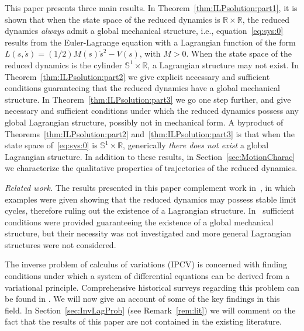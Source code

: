 This paper presents three main results. In
Theorem~\ref{thm:ILPsolution:part1}, it is shown that when the state
space of the reduced dynamics is $\mathbb{R} \times \mathbb{R}$, the reduced
dynamics {\em always} admit a global mechanical structure, i.e.,
equation~\eqref{eq:sys:0} results from the Euler-Lagrange equation
with a Lagrangian function of the form $L(s,\dot s) = (1/2) M(s) \dot
s^2 - V(s)$, with $M > 0$.  When the state space of the reduced
dynamics is the cylinder $\mathbb{S}^1 \times \mathbb{R}$, a Lagrangian structure
may not exist. In Theorem~\ref{thm:ILPsolution:part2} we give explicit
necessary and sufficient conditions guaranteeing that the reduced
dynamics have a global mechanical structure.  In
Theorem~\ref{thm:ILPsolution:part3} we go one step further, and give
necessary and sufficient conditions under which the reduced dynamics
possess any global Lagrangian structure, possibly not in mechanical
form. A byproduct of Theorems~\ref{thm:ILPsolution:part2}
and~\ref{thm:ILPsolution:part3} is that when the state space
of~\eqref{eq:sys:0} is $\mathbb{S}^1 \times \mathbb{R}$, generically {\em there does
	not exist} a global Lagrangian structure.  In addition to these
results, in Section~\ref{sec:MotionCharac} we characterize the
qualitative properties of trajectories of the reduced dynamics.

{\em Related work.}  The results presented in this paper complement
work in~\cite{Maggiore-2012,Consolini-2012}, in which examples were
given showing that the reduced dynamics may possess stable limit
cycles, therefore ruling out the existence of a Lagrangian structure.
In~\cite{Maggiore-2012} sufficient conditions were provided
guaranteeing the existence of a global mechanical structure, but their
necessity was not investigated and more general Lagrangian structures
were not considered.

The inverse problem of calculus of variations (IPCV) is concerned with
finding conditions under which a system of differential equations can
be derived from a variational principle. Comprehensive historical
surveys regarding this problem can be found in \cite{Santilli-1978,
	TontiSurvey, HandbookGlobA}. We will now give an account of some of the
key findings in this field.  In Section~\ref{sec:InvLagProb} (see
Remark~\ref{rem:lit}) we will comment on the fact that the results of
this paper are not contained in the existing literature.

